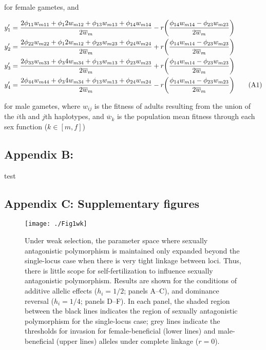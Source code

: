 \documentclass{article}
\newcommand\numberthis{\addtocounter{equation}{1}\tag{\theequation}}
\begin{document}
\noindent{} for female gametes, and 

\begin{align*}
	y'_1 &= \frac{2 \phi_{11} w_{m11} + \phi_12 w_{m12} + \phi_{13} w_{m13} + \phi_{14} w_{m14}}{2 \overline{w}_m} -
				r \bigg( \frac{\phi_{14} w_{m14} - \phi_{23} w_{m23}} {2 \overline{w}_m} \bigg) \\
	y'_2 &= \frac{2 \phi_{22} w_{m22} + \phi_12 w_{m12} + \phi_{23} w_{m23} + \phi_{24} w_{m24}}{2 \overline{w}_m} +
				r \bigg( \frac{\phi_{14} w_{m14} - \phi_{23} w_{m23}} {2 \overline{w}_m} \bigg) \\
	y'_3 &= \frac{2 \phi_{33} w_{m33} + \phi_34 w_{m34} + \phi_{13} w_{m13} + \phi_{23} w_{m23}}{2 \overline{w}_m} +
				r \bigg( \frac{\phi_{14} w_{m14} - \phi_{23} w_{m23}} {2 \overline{w}_m} \bigg) \\
	y'_4 &= \frac{2 \phi_{44} w_{m44} + \phi_34 w_{m34} + \phi_{13} w_{m13} + \phi_{24} w_{m24}}{2 \overline{w}_m} -
				r \bigg( \frac{\phi_{14} w_{m14} - \phi_{23} w_{m23}} {2 \overline{w}_m} \bigg) \numberthis
\end{align*}

\noindent{} for male gametes, where ${w}_{ij}$ is the fitness of adults resulting from the union of the $i$th and $j$th haplotypes, and $\overline{w}_k$ is the population mean fitness through each sex function ($k \in [m,f]$)











\subsection*{Appendix B: }
\renewcommand{\thefigure}{B\arabic{figure}}
\setcounter{figure}{0}

test





\subsection*{Appendix C: Supplementary figures}
\renewcommand{\thefigure}{C\arabic{figure}}
\setcounter{figure}{0}

\begin{figure}[!ht]
\texttt{[image: ./Fig1wk]}
\caption{Under weak selection, the parameter space where sexually antagonistic polymorphism is maintained only expanded beyond the single-locus case when there is very tight linkage between loci. Thus, there is little scope for self-fertilization to influence sexually antagonistic polymorphism. Results are shown for the conditions of additive allelic effects ($h_i = 1/2$; panels A--C), and dominance reversal ($h_i = 1/4$; panels D--F). In each panel, the shaded region between the black lines indicates the region of sexually antagonistic polymorphism for the single-locus case; grey lines indicate the thresholds for invasion for female-beneficial (lower lines) and male-beneficial (upper lines) alleles under complete linkage ($r = 0$).}
\label{Fig:Fig1wk.pdf}
\end{figure}
\newpage{}
\end{document}
